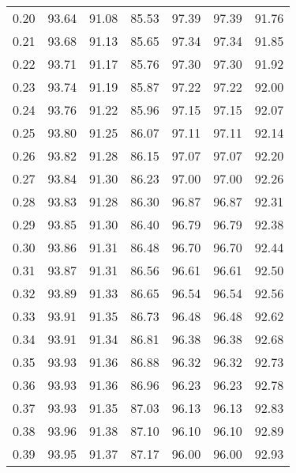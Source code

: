 \begin{tabular}{|c|c|c|c|c|c|c|}
      0.20 &     93.64 &     91.08 &      85.53 &   97.39 &      97.39 &         91.76 \\
      0.21 &     93.68 &     91.13 &      85.65 &   97.34 &      97.34 &         91.85 \\
      0.22 &     93.71 &     91.17 &      85.76 &   97.30 &      97.30 &         91.92 \\
      0.23 &     93.74 &     91.19 &      85.87 &   97.22 &      97.22 &         92.00 \\
      0.24 &     93.76 &     91.22 &      85.96 &   97.15 &      97.15 &         92.07 \\
      0.25 &     93.80 &     91.25 &      86.07 &   97.11 &      97.11 &         92.14 \\
      0.26 &     93.82 &     91.28 &      86.15 &   97.07 &      97.07 &         92.20 \\
      0.27 &     93.84 &     91.30 &      86.23 &   97.00 &      97.00 &         92.26 \\
      0.28 &     93.83 &     91.28 &      86.30 &   96.87 &      96.87 &         92.31 \\
      0.29 &     93.85 &     91.30 &      86.40 &   96.79 &      96.79 &         92.38 \\
      0.30 &     93.86 &     91.31 &      86.48 &   96.70 &      96.70 &         92.44 \\
      0.31 &     93.87 &     91.31 &      86.56 &   96.61 &      96.61 &         92.50 \\
      0.32 &     93.89 &     91.33 &      86.65 &   96.54 &      96.54 &         92.56 \\
      0.33 &     93.91 &     91.35 &      86.73 &   96.48 &      96.48 &         92.62 \\
      0.34 &     93.91 &     91.34 &      86.81 &   96.38 &      96.38 &         92.68 \\
      0.35 &     93.93 &     91.36 &      86.88 &   96.32 &      96.32 &         92.73 \\
      0.36 &     93.93 &     91.36 &      86.96 &   96.23 &      96.23 &         92.78 \\
      0.37 &     93.93 &     91.35 &      87.03 &   96.13 &      96.13 &         92.83 \\
      0.38 &     93.96 &     91.38 &      87.10 &   96.10 &      96.10 &         92.89 \\
      0.39 &     93.95 &     91.37 &      87.17 &   96.00 &      96.00 &         92.93 \\

\end{tabular}
